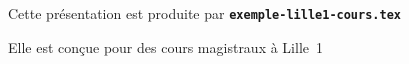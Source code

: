  \item Cette présentation est produite par \texttt{\textbf{exemple-lille1-cours.tex}}
  \item Elle est conçue pour des cours magistraux à Lille~1
